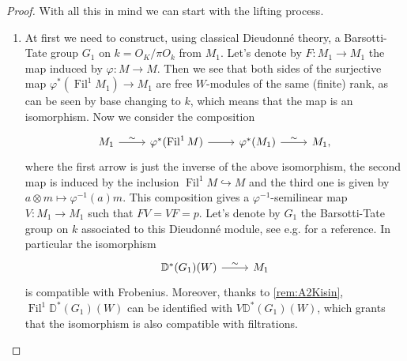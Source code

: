 \begin{proof}
With all this in mind we can start with the lifting process.
\begin{enumerate}
\item	At first we need to construct, using classical Dieudonné theory,
	a Barsotti-Tate group $G_1$ on $k = O_K/\pi O_k$ from $M_1$.
	Let's denote by $F\colon M_1 \to M_1$ the map induced by
	$\varphi\colon M \to M$.
	Then we see that both sides of the surjective map
	$\varphi^* ( \operatorname{Fil}^1 M_1) \to M_1$ are free $W$-modules of the same (finite) rank,
	as can be seen by base changing to $k$, which means that the map is an isomorphism.
	Now we consider the composition
	\begin{equation*}
	\begin{tikzcd}
		M_1 \arrow[r, "\sim", rightarrow] &
		\varphi^* (\operatorname{Fil}^1 M) \arrow[r, "", rightarrow] &
		\varphi^* (M_1) \arrow[r, "\sim", rightarrow] &
		M_1
	,\end{tikzcd}
	\end{equation*}
	where the first arrow is just the inverse of the above isomorphism, the second map
	is induced by the inclusion $\operatorname{Fil}^1 M \hookrightarrow M$ and the
	third one is given by $a \otimes m \mapsto \varphi^{-1}(a)m$.
	This composition gives a $\varphi^{-1}$-semilinear map $V\colon M_1 \to M_1$
	such that $FV = VF = p$.
	Let's denote by $G_1$ the Barsotti-Tate group on $k$ associated to this
	Dieudonné module, see e.g. \cite[Proposition 7.2.6]{Brinon} for a reference.
	In particular the isomorphism
	\begin{equation*}
	\begin{tikzcd}[row sep = 0ex
		,/tikz/column 1/.append style={anchor=base east}
		,/tikz/column 2/.append style={anchor=base west}]
		\mathbb{D}^*(G_1)(W) \arrow[r, "\sim", rightarrow] &
		M_1
	\end{tikzcd}
	\end{equation*} 
	is compatible with Frobenius.
	Moreover, thanks to \cref{rem:A2Kisin}, $\operatorname{Fil}^1 \mathbb{D}^*(G_1)(W)$
	can be identified with $V \mathbb{D}^*(G_1)(W)$, which grants that the isomorphism
	is also compatible with filtrations.


\end{enumerate}
\end{proof}
